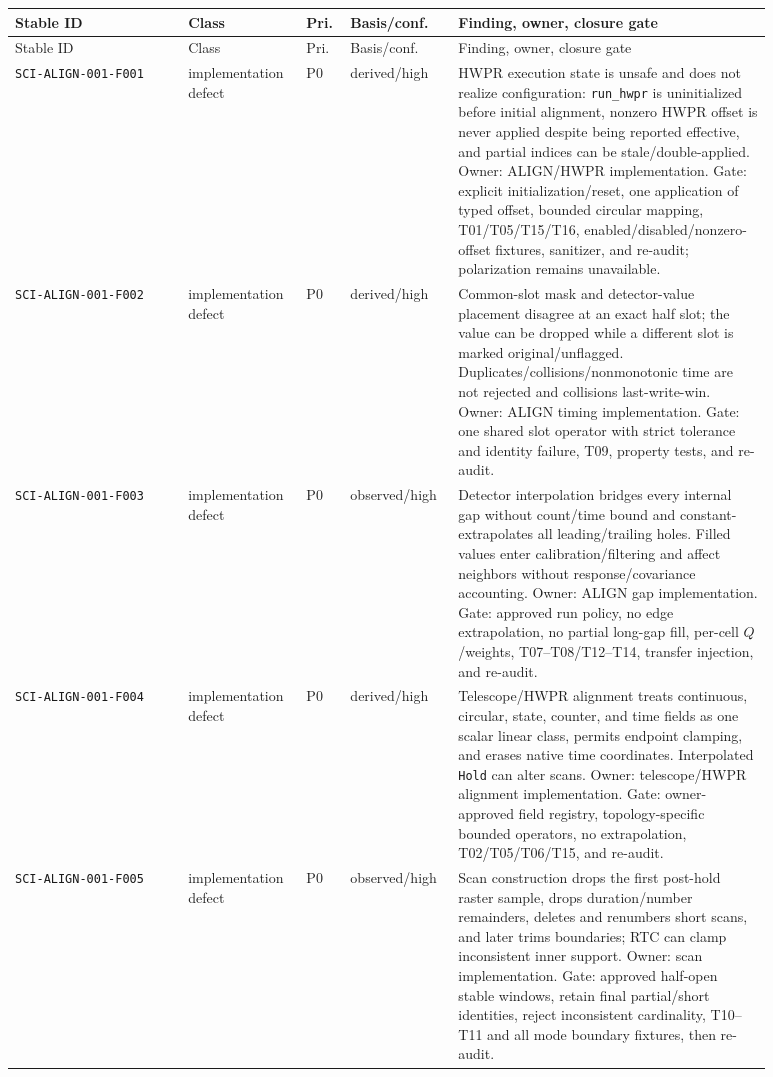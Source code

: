 \documentclass[11pt]{article}
\newcommand{\code}[1]{\nolinkurl{#1}}
\begin{document}
\begin{longtable}{L{0.21\linewidth}L{0.13\linewidth}L{0.05\linewidth}L{0.11\linewidth}L{0.385\linewidth}}
\toprule
Stable ID & Class & Pri. & Basis/conf. & Finding, owner, closure gate\\
\midrule
\endfirsthead
\toprule
Stable ID & Class & Pri. & Basis/conf. & Finding, owner, closure gate\\
\midrule
\endhead
\code{SCI-ALIGN-001-F001} & implementation defect & P0 & derived/high & HWPR execution state is unsafe and does not realize configuration: \code{run_hwpr} is uninitialized before initial alignment, nonzero HWPR offset is never applied despite being reported effective, and partial indices can be stale/double-applied.  Owner: ALIGN/HWPR implementation.  Gate: explicit initialization/reset, one application of typed offset, bounded circular mapping, T01/T05/T15/T16, enabled/disabled/nonzero-offset fixtures, sanitizer, and re-audit; polarization remains unavailable.\\
\code{SCI-ALIGN-001-F002} & implementation defect & P0 & derived/high & Common-slot mask and detector-value placement disagree at an exact half slot; the value can be dropped while a different slot is marked original/unflagged.  Duplicates/collisions/nonmonotonic time are not rejected and collisions last-write-win.  Owner: ALIGN timing implementation.  Gate: one shared slot operator with strict tolerance and identity failure, T09, property tests, and re-audit.\\
\code{SCI-ALIGN-001-F003} & implementation defect & P0 & observed/high & Detector interpolation bridges every internal gap without count/time bound and constant-extrapolates all leading/trailing holes.  Filled values enter calibration/filtering and affect neighbors without response/covariance accounting.  Owner: ALIGN gap implementation.  Gate: approved run policy, no edge extrapolation, no partial long-gap fill, per-cell $Q$/weights, T07--T08/T12--T14, transfer injection, and re-audit.\\
\code{SCI-ALIGN-001-F004} & implementation defect & P0 & derived/high & Telescope/HWPR alignment treats continuous, circular, state, counter, and time fields as one scalar linear class, permits endpoint clamping, and erases native time coordinates.  Interpolated \code{Hold} can alter scans.  Owner: telescope/HWPR alignment implementation.  Gate: owner-approved field registry, topology-specific bounded operators, no extrapolation, T02/T05/T06/T15, and re-audit.\\
\code{SCI-ALIGN-001-F005} & implementation defect & P0 & observed/high & Scan construction drops the first post-hold raster sample, drops duration/number remainders, deletes and renumbers short scans, and later trims boundaries; RTC can clamp inconsistent inner support.  Owner: scan implementation.  Gate: approved half-open stable windows, retain final partial/short identities, reject inconsistent cardinality, T10--T11 and all mode boundary fixtures, then re-audit.\\

\end{longtable}
\end{document}

